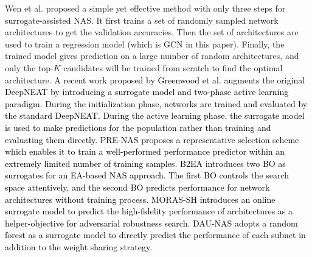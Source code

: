 \documentclass[journal]{IEEEtran}
\begin{document}
Wen et al. \cite{wen2020neural} proposed a simple yet effective method with only three steps for surrogate-assisted NAS. It first trains a set of randomly sampled network architectures to get the validation accuracies. Then the set of architectures are used to train a regression model (which is GCN in this paper). Finally, the trained model gives prediction on a large number of random architectures, and only the top-$K$ candidates will be trained from scratch to find the optimal architecture. \textcolor{black}{A recent work proposed by Greenwood et al. \cite{greenwood2022surrogate} augments the original DeepNEAT \cite{miikkulainen2019evolving} by introducing a surrogate model and two-phase active learning paradigm. During the initialization phase, networks are trained and evaluated by the standard DeepNEAT. During the active learning phase, the surrogate model is used to make predictions for the population rather than training and evaluating them directly. PRE-NAS \cite{peng2022pre} proposes a representative selection scheme which enables it to train a well-performed performance predictor within an extremely limited number of training samples. B2EA \cite{cho2022b2ea} introduces two BO as surrogates for an EA-based NAS approach. The first BO controls the search space attentively, and the second BO predicts performance for network architectures without training process. MORAS-SH \cite{liu2022bi} introduces an online surrogate model to predict the high-fidelity performance of architectures as a helper-objective for adversarial robustness search. DAU-NAS \cite{ying2022multi} adopts a random forest as a surrogate model to directly predict the performance of each subnet in addition to the weight sharing strategy.}
\end{document}
